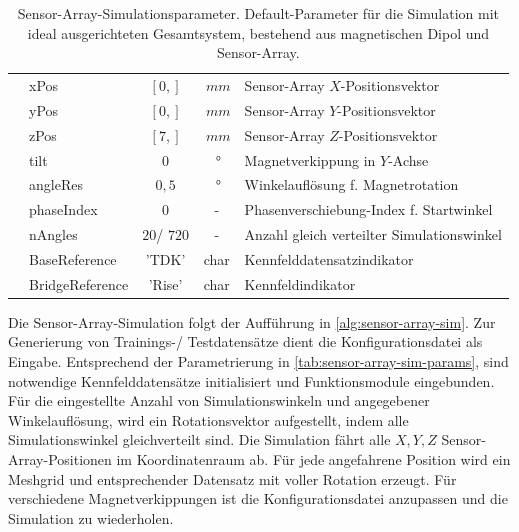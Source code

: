 \begin{table}[!htbp]
{\begin{tabular}{l l c c l}
		                                         & xPos               & $\left[0,\right]$  & $\SI{}{mm}$                     & Sensor-Array $X$-Positionsvektor                \\
		                                         & yPos               & $\left[0,\right]$  & $\SI{}{mm}$                     & Sensor-Array $Y$-Positionsvektor                \\
		                                         & zPos               & $\left[7,\right]$  & $\SI{}{mm}$                     & Sensor-Array $Z$-Positionsvektor                \\
		                                         & tilt               & $0$                & $\SI{}{\degree}$                & Magnetverkippung in $Y$-Achse                   \\
		                                         & angleRes           & $0,5$              & $\SI{}{\degree}$                & Winkelauflösung f. Magnetrotation               \\
		                                         & phaseIndex         & 0                  & -                               & Phasenverschiebung-Index f. Startwinkel         \\
		                                         & nAngles            & $20$/ $720$        & -                               & Anzahl gleich verteilter Simulationswinkel      \\
		                                         & BaseReference      & 'TDK'              & char                            & Kennfelddatensatzindikator                      \\
		                                         & BridgeReference    & 'Rise'             & char                            & Kennfeldindikator                               \\ \bottomrule
	\end{tabular}}
	\caption[Sensor-Array-Simulationsparameter]{Sensor-Array-Simulationsparameter. Default-Parameter für die Simulation mit ideal ausgerichteten Gesamtsystem, bestehend aus magnetischen Dipol und Sensor-Array.}
	\label{tab:sensor-array-sim-params}
\end{table}


\clearpage


Die Sensor-Array-Simulation folgt der Aufführung in \autoref{alg:sensor-array-sim}. Zur Generierung von Trainings-/ Testdatensätze dient die Konfigurationsdatei als Eingabe. Entsprechend der Parametrierung in \autoref{tab:sensor-array-sim-params}, sind notwendige Kennfelddatensätze initialisiert und Funktionsmodule eingebunden. Für die eingestellte Anzahl von Simulationswinkeln und angegebener Winkelauflösung, wird ein Rotationsvektor aufgestellt, indem alle Simulationswinkel gleichverteilt sind. Die Simulation fährt alle $X,Y,Z$ Sensor-Array-Positionen im Koordinatenraum ab. Für jede angefahrene Position wird ein Meshgrid und entsprechender Datensatz mit voller Rotation erzeugt. Für verschiedene Magnetverkippungen ist die Konfigurationsdatei anzupassen und die Simulation zu wiederholen.


